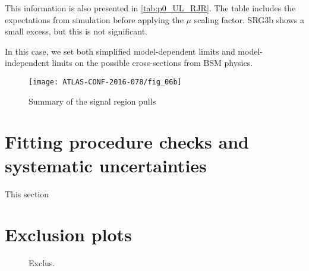 This information is also presented in \ref{tab:p0_UL_RJR}.
The table includes the expectations from simulation before applying the $\mu$ scaling factor.
SRG3b shows a small excess, but this is not significant.

In this case, we set both simplified model-dependent limits and model-independent limits on the possible cross-sections from BSM physics.

\begin{figure}[tbph]
\centering
\caption{Summary of the signal region pulls} \label{fig:sr_summary}
\texttt{[image: ATLAS-CONF-2016-078/fig\_06b]}
\end{figure}


\section{Fitting procedure checks and systematic uncertainties}

This section


\section{Exclusion plots}

\begin{figure}[tbph]
\centering
\caption{Exclus.}
\label{fig:srs_scale}
\end{figure}
